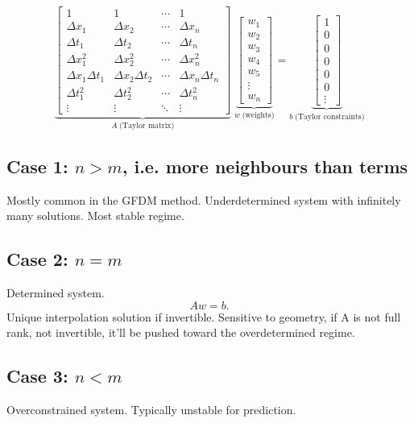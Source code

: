 \documentclass[12pt, a4paper, twoside]{report}
\theoremstyle{plain}
\theoremstyle{definition}
\begin{document}
\[
\underbrace{
\begin{bmatrix}
1 & 1 & \cdots & 1 \\
\Delta x_1 & \Delta x_2 & \cdots & \Delta x_n \\
\Delta t_1 & \Delta t_2 & \cdots & \Delta t_n \\
\Delta x_1^2 & \Delta x_2^2 & \cdots & \Delta x_n^2 \\
\Delta x_1\Delta t_1 & \Delta x_2\Delta t_2 & \cdots & \Delta x_n\Delta t_n \\
\Delta t_1^2 & \Delta t_2^2 & \cdots & \Delta t_n^2 \\
\vdots & \vdots & \ddots & \vdots
\end{bmatrix}
}_{A\;\text{(Taylor matrix)}}
\;
\underbrace{
\begin{bmatrix}
w_1\\
w_2\\
w_3\\
w_4\\
w_5\\
\vdots\\
w_n
\end{bmatrix}
}_{w\;\text{(weights)}}
=
\underbrace{
\begin{bmatrix}
1\\
0\\
0\\
0\\
0\\
0\\
\vdots
\end{bmatrix}
}_{b\;\text{(Taylor constraints)}} \label{taylor system}
\]

\subsection*{Case 1: $n>m$, i.e. more neighbours than terms}
 Mostly common in the GFDM method. Underdetermined system with infinitely many solutions. Most stable regime.
\subsection*{Case 2: $n=m$}
Determined system.
\[
Aw=b.
\]
Unique interpolation solution if invertible.  
Sensitive to geometry, if A is not full rank, not invertible, it'll be pushed toward the overdetermined regime.
\subsection*{Case 3: $n<m$}
Overconstrained system. Typically unstable for prediction.
\end{document}
